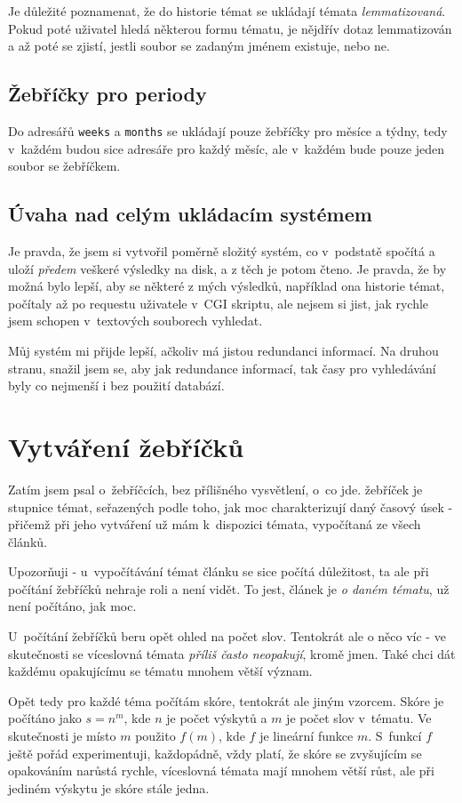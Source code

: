 \documentclass[12pt]{amsart}
\begin{document}
Je důležité poznamenat, že do historie témat se ukládají témata \emph{lemmatizovaná}. Pokud poté uživatel hledá některou formu tématu, je nějdřív dotaz lemmatizován a až poté se zjistí, jestli soubor se zadaným jménem existuje, nebo ne.

\subsection{Žebříčky pro periody}
Do adresářů \texttt{weeks} a \texttt{months} se ukládají pouze žebříčky pro měsíce a týdny, tedy v~každém budou sice adresáře pro každý měsíc, ale v~každém bude pouze jeden soubor se žebříčkem.

\subsection{Úvaha nad celým ukládacím systémem}
Je pravda, že jsem si vytvořil po\-měr\-ně složitý systém, co v~podstatě spočítá a uloží \emph{předem} veškeré výsledky na disk, a z těch je potom čteno. Je pravda, že by možná bylo lepší, aby se některé z mých výsledků, například ona historie témat, počítaly až po requestu uživatele v~CGI skriptu, ale nejsem si jist, jak rychle jsem schopen v~textových souborech vyhledat. 

Můj systém mi přijde lepší, ačkoliv má jistou redundanci informací. Na druhou stranu, snažil jsem se, aby jak redundance informací, tak časy pro vyhledávání byly co nejmenší i bez použití databází.

\section{Vytváření žebříčků}
Zatím jsem psal o~žebříčcích, bez přílišného vysvětlení, o~co jde. žebříček je stupnice témat, seřazených podle toho, jak moc charakterizují daný časový úsek - přičemž při jeho vytváření už mám k~dispozici témata, vypočítaná ze všech článků.

Upozorňuji - u~vypočítávání témat článku se sice počítá důležitost, ta ale při počítání žebříčků nehraje roli a není vidět. To jest, článek je \emph{o daném tématu}, už není počítáno, jak moc.

U~počítání žebříčků beru opět ohled na počet slov. Tentokrát ale o něco víc - ve skutečnosti se víceslovná témata \emph{příliš často neopakují}, kromě jmen. Také chci dát každému opakujícímu se tématu mnohem větší význam.

Opět tedy pro každé téma počítám skóre, tentokrát ale jiným vzorcem. Skóre je počítáno jako $s = n^m$, kde $n$ je počet výskytů a $m$ je počet slov v~tématu. Ve skutečnosti je místo $m$ použito $f(m)$, kde $f$ je lineární funkce $m$. S~funkcí $f$ ještě pořád experimentuji, každopádně, vždy platí, že skóre se zvyšujícím se opakováním narůstá rychle, víceslovná témata mají mnohem větší růst, ale při jediném výskytu je skóre stále jedna.
\end{document}

